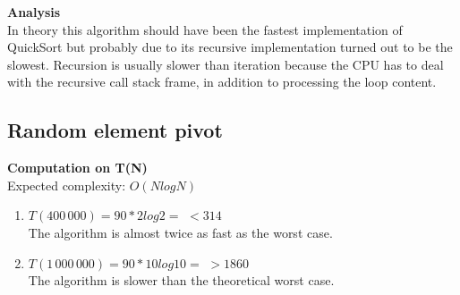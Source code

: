 \documentclass{article}
\begin{document}
\textbf{Analysis}\\

In theory this algorithm should have been the fastest implementation of QuickSort but probably due to its recursive implementation turned out to be the slowest. Recursion is usually slower than iteration because the CPU has to deal with the recursive call stack frame, in addition to processing the loop content.

\newpage
\subsection{Random element pivot}

\begin{center}
\end{center}

\textbf{Computation on T(N)}\\

Expected complexity: $O(NlogN)$\\

\begin{enumerate}
    \item $T(400\,000) = 90 *2 log 2 =$
    $< 314$\\
    The algorithm is almost twice as fast as the worst case.
    
    \item $T(1\,000\,000) = 90 *10 log 10 =$
    $> 1860$\\
    The algorithm is slower than the theoretical worst case.
    
\end{enumerate}
\end{document}
